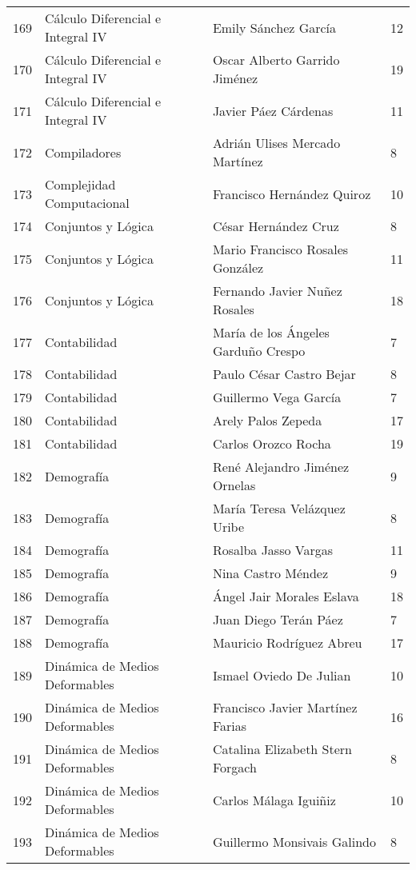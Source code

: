 \begin{table}[ht]
\begin{tabular}{rlll}
  169 & Cálculo Diferencial e Integral IV & Emily Sánchez García & 12 \\ 
  170 & Cálculo Diferencial e Integral IV & Oscar Alberto Garrido Jiménez & 19 \\ 
  171 & Cálculo Diferencial e Integral IV & Javier Páez Cárdenas & 11 \\ 
  172 & Compiladores & Adrián Ulises Mercado Martínez & 8 \\ 
  173 & Complejidad Computacional & Francisco Hernández Quiroz & 10 \\ 
  174 & Conjuntos y Lógica & César Hernández Cruz & 8 \\ 
  175 & Conjuntos y Lógica & Mario Francisco Rosales González & 11 \\ 
  176 & Conjuntos y Lógica & Fernando Javier Nuñez Rosales & 18 \\ 
  177 & Contabilidad & María de los Ángeles Garduño Crespo & 7 \\ 
  178 & Contabilidad & Paulo César Castro Bejar & 8 \\ 
  179 & Contabilidad & Guillermo Vega García & 7 \\ 
  180 & Contabilidad & Arely Palos Zepeda & 17 \\ 
  181 & Contabilidad & Carlos Orozco Rocha & 19 \\ 
  182 & Demografía & René Alejandro Jiménez Ornelas & 9 \\ 
  183 & Demografía & María Teresa Velázquez Uribe & 8 \\ 
  184 & Demografía & Rosalba Jasso Vargas & 11 \\ 
  185 & Demografía & Nina Castro Méndez & 9 \\ 
  186 & Demografía & Ángel Jair Morales Eslava & 18 \\ 
  187 & Demografía & Juan Diego Terán Páez & 7 \\ 
  188 & Demografía & Mauricio Rodríguez Abreu & 17 \\ 
  189 & Dinámica de Medios Deformables & Ismael Oviedo De Julian & 10 \\ 
  190 & Dinámica de Medios Deformables & Francisco Javier Martínez Farias & 16 \\ 
  191 & Dinámica de Medios Deformables & Catalina Elizabeth Stern Forgach & 8 \\ 
  192 & Dinámica de Medios Deformables & Carlos Málaga Iguiñiz & 10 \\ 
  193 & Dinámica de Medios Deformables & Guillermo Monsivais Galindo & 8 \\ 

\end{tabular}
\end{table}
